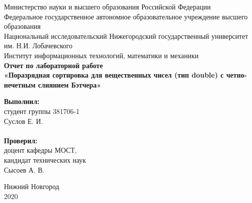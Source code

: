 \documentclass{article}
\begin{document}
\begin{titlepage}

\begin{center}
Министерство науки и высшего образования Российской Федерации \\
\vspace{5mm}
Федеральное государственное автономное образовательное учреждение высшего образования \\
Национальный исследовательский Нижегородский государственный университет им. Н.И. Лобачевского \\
\vspace{1cm}
Институт информационных технологий, математики и механики \\
\vspace{5cm}
\textbf{\large Отчет по лабораторной работе} \\
\vspace{8mm}
\textbf{\Large «Поразрядная сортировка для вещественных чисел (тип double) с четно-нечетным слиянием Бэтчера»} \\
\end{center}

\vspace{3cm}

\newbox{\lbox}
\newlength{\maxl}
\setlength{\maxl}{\wd\lbox}
\hfill\parbox{7cm}{
\hspace*{5cm}\hspace*{-5cm}\textbf{Выполнил:} \\ студент группы 381706-1 \\ Суслов Е. И.\\
\\
\hspace*{5cm}\hspace*{-5cm}\textbf{Проверил:} \\ доцент кафедры МОСТ, \\ кандидат технических наук \\ Сысоев А. В.
}

\vspace{\fill}

\begin{center}
Нижний Новгород \\ 2020
\end{center}
\end{titlepage}

\setcounter{page}{2}

\tableofcontents

\newpage
\end{document}
